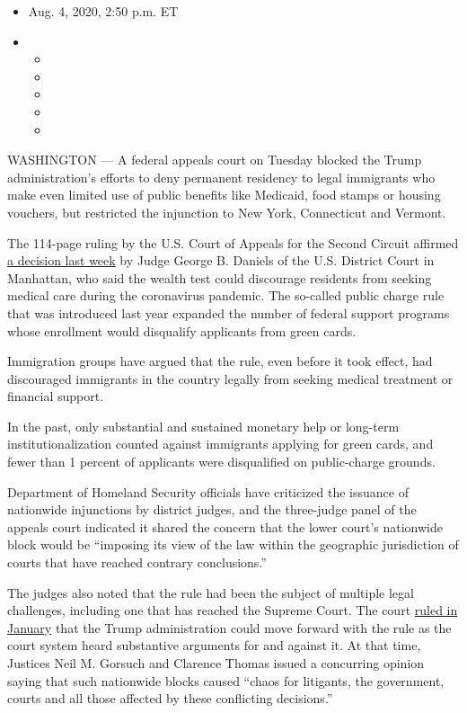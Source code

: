 \begin{itemize}
\item
  Aug. 4, 2020, 2:50 p.m. ET
\item
  \begin{itemize}
  \item
  \item
  \item
  \item
  \item
  \end{itemize}
\end{itemize}

WASHINGTON --- A federal appeals court on Tuesday blocked the Trump
administration's efforts to deny permanent residency to legal immigrants
who make even limited use of public benefits like Medicaid, food stamps
or housing vouchers, but restricted the injunction to New York,
Connecticut and Vermont.

The 114-page ruling by the U.S. Court of Appeals for the Second Circuit
affirmed
\href{https://www.nytimes.com/2020/07/30/us/trump-green-card.html}{a
decision last week} by Judge George B. Daniels of the U.S. District
Court in Manhattan, who said the wealth test could discourage residents
from seeking medical care during the coronavirus pandemic. The so-called
public charge rule that was introduced last year expanded the number of
federal support programs whose enrollment would disqualify applicants
from green cards.

Immigration groups have argued that the rule, even before it took
effect, had discouraged immigrants in the country legally from seeking
medical treatment or financial support.

In the past, only substantial and sustained monetary help or long-term
institutionalization counted against immigrants applying for green
cards, and fewer than 1 percent of applicants were disqualified on
public-charge grounds.

Department of Homeland Security officials have criticized the issuance
of nationwide injunctions by district judges, and the three-judge panel
of the appeals court indicated it shared the concern that the lower
court's nationwide block would be ``imposing its view of the law within
the geographic jurisdiction of courts that have reached contrary
conclusions.''

The judges also noted that the rule had been the subject of multiple
legal challenges, including one that has reached the Supreme Court. The
court
\href{https://www.nytimes.com/2020/01/27/us/supreme-court-trump-green-cards.html}{ruled
in January} that the Trump administration could move forward with the
rule as the court system heard substantive arguments for and against it.
At that time, Justices Neil M. Gorsuch and Clarence Thomas issued a
concurring opinion saying that such nationwide blocks caused ``chaos for
litigants, the government, courts and all those affected by these
conflicting decisions.''

